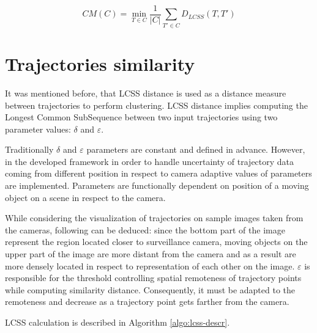 \begin{equation} \label{eq:cm_traj}
	CM(C) = \min\limits_{T \in C} \frac{1}{|C|} \sum_{T' \in C} D_{LCSS}(T, T')
\end{equation}


\section{Trajectories similarity}

It was mentioned before, that LCSS distance is used as a distance measure between trajectories to perform clustering. LCSS distance implies computing the Longest Common SubSequence between two input trajectories using two parameter values: $\delta$ and $\varepsilon$. 

Traditionally $\delta$ and $\varepsilon$ parameters are constant and defined in advance. However, in the developed framework in order to handle uncertainty of trajectory data coming from different position in respect to camera adaptive values of parameters are implemented. Parameters are functionally dependent on position of a moving object on a scene in respect to the camera. 

While considering the visualization of trajectories on sample images taken from the cameras, following can be deduced: since the bottom part of the image represent the region located closer to surveillance camera, moving objects on the upper part of the image are more distant from the camera and as a result are more densely located in respect to representation of each other on the image. $\varepsilon$ is responsible for the threshold controlling spatial remoteness of trajectory points while computing similarity distance. Consequently, it must be adapted to the remoteness and decrease as a trajectory point gets farther from the camera.


LCSS calculation is described in Algorithm \ref{algo:lcss-descr}.

